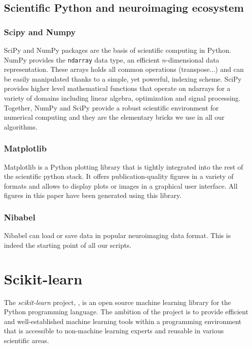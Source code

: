 \documentclass{frontiersSCNS} %
\begin{document}
\subsection{Scientific Python and neuroimaging ecosystem}

\subsubsection{Scipy and Numpy}

SciPy and NumPy packages are the basis of scientific computing in Python.
NumPy provides the \verb!ndarray! data type, an efficient $n$-dimensional data
representation. These arrays holds all common operations (transpose...) and
can be easily manipulated thanks to a simple, yet powerful, indexing scheme.
SciPy provides higher level mathematical functions that operate on ndarrays for
a variety of domains including linear algebra, optimization and signal
processing. Together, NumPy and SciPy provide a robust scientific environment
for numerical computing and they are the elementary bricks we use in all our
algorithms.

\subsubsection{Matplotlib}

Matplotlib is a Python plotting library that is tightly integrated into the
rest of the scientific python stack. It offers publication-quality figures in
a variety of formats and allows to display plots or images in a
graphical user interface. All figures in this paper have been generated using
this library.


\subsubsection{Nibabel}

Nibabel can load or save data in
popular neuroimaging data format. This is indeed the starting point of all
our scripts.

\section{Scikit-learn}
\label{scikitlearn}

The {\em scikit-learn} project, \cite{pedregosa2011}, is an open source machine
learning library for the Python programming language. The ambition of the
project is to provide efficient and well-established machine learning tools within
a programming environment that is accessible to non-machine learning experts
and reusable in various scientific areas.
    
\end{document}
